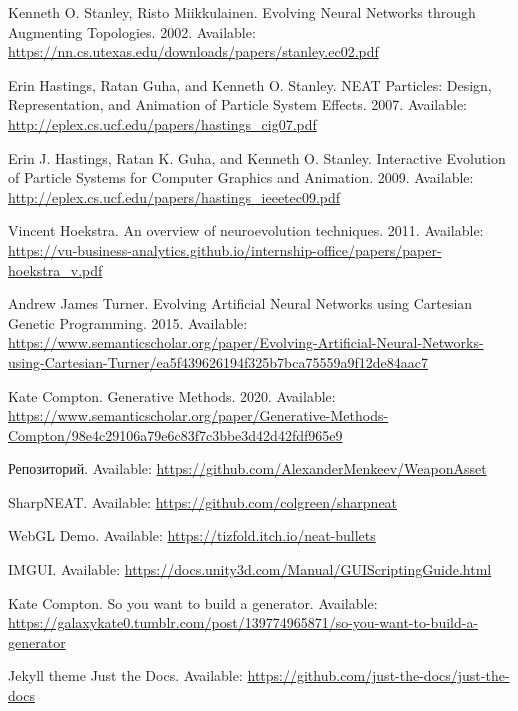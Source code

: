 \begin{thebibliography}{1}

     Kenneth O. Stanley, Risto Miikkulainen. \flqq Evolving Neural Networks through Augmenting Topologies\frqq. 2002. Available: \url{https://nn.cs.utexas.edu/downloads/papers/stanley.ec02.pdf}

     Erin Hastings, Ratan Guha, and Kenneth O. Stanley. \flqq NEAT Particles: Design, Representation, and Animation of Particle System Effects\frqq. 2007. Available: \url{http://eplex.cs.ucf.edu/papers/hastings_cig07.pdf}

     Erin J. Hastings, Ratan K. Guha, and Kenneth O. Stanley. \flqq Interactive Evolution of Particle Systems for Computer Graphics and Animation\frqq. 2009. Available: \url{http://eplex.cs.ucf.edu/papers/hastings_ieeetec09.pdf}

     Vincent Hoekstra. \flqq An overview of neuroevolution techniques\frqq. 2011. Available: \url{https://vu-business-analytics.github.io/internship-office/papers/paper-hoekstra_v.pdf}

     Andrew James Turner. \flqq Evolving Artificial Neural Networks using Cartesian Genetic Programming\frqq. 2015. Available: \url{https://www.semanticscholar.org/paper/Evolving-Artificial-Neural-Networks-using-Cartesian-Turner/ea5f439626194f325b7bca75559a9f12de84aac7}

     Kate Compton. \flqq Generative Methods\frqq. 2020. Available: \url{https://www.semanticscholar.org/paper/Generative-Methods-Compton/98e4c29106a79e6c83f7c3bbe3d42d42fdf965e9}

     Репозиторий. Available: \url{https://github.com/AlexanderMenkeev/WeaponAsset}

     SharpNEAT. Available: \url{https://github.com/colgreen/sharpneat}

     WebGL Demo. Available: \url{https://tizfold.itch.io/neat-bullets}

     IMGUI. Available: \url{https://docs.unity3d.com/Manual/GUIScriptingGuide.html}

     Kate Compton. \flqq So you want to build a generator\frqq. Available: \url{https://galaxykate0.tumblr.com/post/139774965871/so-you-want-to-build-a-generator}

     Jekyll theme Just the Docs. Available: \url{https://github.com/just-the-docs/just-the-docs}


\end{thebibliography}

